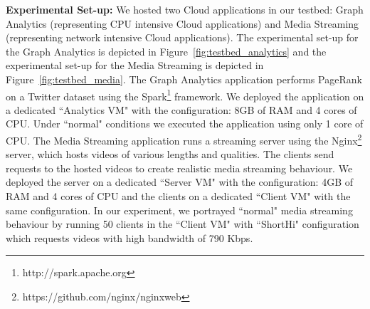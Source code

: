 \textbf{Experimental Set-up:} We hosted two Cloud applications in our testbed: Graph Analytics (representing CPU intensive Cloud applications) and Media Streaming (representing network intensive Cloud applications). The experimental set-up for the Graph Analytics is depicted in Figure~\ref{fig:testbed_analytics} and the experimental set-up for the Media Streaming is depicted in Figure~\ref{fig:testbed_media}.
The Graph Analytics application performs PageRank on a Twitter dataset using the Spark\footnote{http://spark.apache.org} framework. We deployed the application on a dedicated ``Analytics VM" with the configuration: 8GB of RAM and 4 cores of CPU. Under ``normal" conditions we executed the application using only 1 core of CPU.
The Media Streaming application runs a streaming server using the Nginx\footnote{https://github.com/nginx/nginxweb} server, which hosts videos of various lengths and qualities.  
The clients send requests to the hosted videos to create realistic media streaming behaviour.  
We deployed the server on a dedicated ``Server VM" with the configuration: 4GB of RAM and 4 cores of CPU and the clients on a dedicated ``Client VM" with the same configuration.
In our experiment, we portrayed ``normal" media streaming behaviour by running 50 clients in the ``Client VM" with ``ShortHi" configuration which requests videos with high bandwidth of 790 Kbps.

